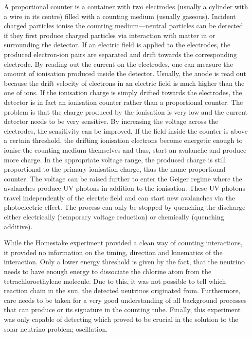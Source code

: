 A proportional counter is a container with two electrodes (usually a cylinder with a wire in its centre) filled with a counting medium (usually gaseous).
Incident charged particles ionise the counting medium---neutral particles can be detected if they first produce charged particles via interaction with matter in or surrounding the detector.
If an electric field is applied to the electrodes, the produced electron-ion pairs are separated and drift towards the corresponding electrode.
By reading out the current on the electrodes, one can measure the amount of ionisation produced inside the detector.
Usually, the anode is read out because the drift velocity of electrons in an electric field is much higher than the one of ions.
If the ionisation charge is simply drifted towards the electrodes, the detector is in fact an ionisation counter rather than a proportional counter.
The problem is that the charge produced by the ionisation is very low and the current detector needs to be very sensitive.
By increasing the voltage across the electrodes, the sensitivity can be improved.
If the field inside the counter is above a certain threshold, the drifting ionisation electrons become energetic enough to ionise the counting medium themselves and thus, start an avalanche and produce more charge.
In the appropriate voltage range, the produced charge is still proportional to the primary ionisation charge, thus the name proportional counter.
The voltage can be raised further to enter the Geiger regime where the avalanches produce UV photons in addition to the ionisation.
These UV photons travel independently of the electric field and can start new avalanches via the photoelectric effect.
The process can only be stopped by quenching the discharge either electrically (temporary voltage reduction) or chemically (quenching additive).

While the Homestake experiment provided a clean way of counting \Pgne interactions, it provided no information on the timing, direction and kinematics of the interaction.
Only a lower energy threshold is given by the fact, that the neutrino needs to have enough energy to dissociate the chlorine atom from the tetrachloroethylene molecule.
Due to this, it was not possible to tell which reaction chain in the sun, the detected neutrinos originated from.
Furthermore, care needs to be taken for a very good understanding of all background processes that can produce  or its signature in the counting tube.
Finally, this experiment was only capable of detecting \Pgne which proved to be crucial in the solution to the solar neutrino problem; oscillation.

